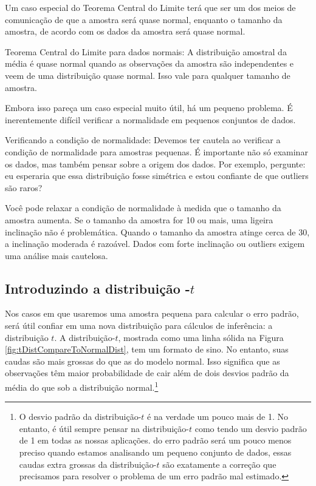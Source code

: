 \documentclass[
]{book}
\theoremstyle{definition}
\theoremstyle{definition}
\theoremstyle{definition}
\theoremstyle{definition}
\theoremstyle{remark}
\begin{document}
Um caso especial do Teorema Central do Limite terá que ser um dos meios de comunicação de que a amostra será quase normal, enquanto o tamanho da amostra, de acordo com os dados da amostra será quase normal.

Teorema Central do Limite para dados normais: A distribuição amostral da média é quase normal quando as observações da amostra são independentes e veem de uma distribuição quase normal. Isso vale para qualquer tamanho de amostra.

Embora isso pareça um caso especial muito útil, há um pequeno problema. É inerentemente difícil verificar a normalidade em pequenos conjuntos de dados.

Verificando a condição de normalidade: Devemos ter cautela ao verificar a condição de normalidade para amostras pequenas. É importante não só examinar os dados, mas também pensar sobre a origem dos dados. Por exemplo, pergunte: eu esperaria que essa distribuição fosse simétrica e estou confiante de que outliers são raros?

Você pode relaxar a condição de normalidade à medida que o tamanho da amostra aumenta. Se o tamanho da amostra for 10 ou mais, uma ligeira inclinação não é problemática. Quando o tamanho da amostra atinge cerca de 30, a inclinação moderada é razoável. Dados com forte inclinação ou outliers exigem uma análise mais cautelosa.

\hypertarget{introTDistribution}{%
\subsection{\texorpdfstring{Introduzindo a distribuição -\(t\)}{Introduzindo a distribuição -t}}\label{introTDistribution}}

Nos casos em que usaremos uma amostra pequena para calcular o erro padrão, será útil confiar em uma nova distribuição para cálculos de inferência: a distribuição \(t\). A distribuição-\(t\), mostrada como uma linha sólida na Figura \ref{fig:tDistCompareToNormalDist}, tem um formato de sino. No entanto, suas caudas são mais grossas do que as do modelo normal. Isso significa que as observações têm maior probabilidade de cair além de dois desvios padrão da média do que sob a distribuição normal.\footnote{O desvio padrão da distribuição-\(t\) é na verdade um pouco mais de 1. No entanto, é útil sempre pensar na distribuição-\(t\) como tendo um desvio padrão de 1 em todas as nossas aplicações. do erro padrão será um pouco menos preciso quando estamos analisando um pequeno conjunto de dados, essas caudas extra grossas da distribuição-\(t\) são exatamente a correção que precisamos para resolver o problema de um erro padrão mal estimado.}
\end{document}
